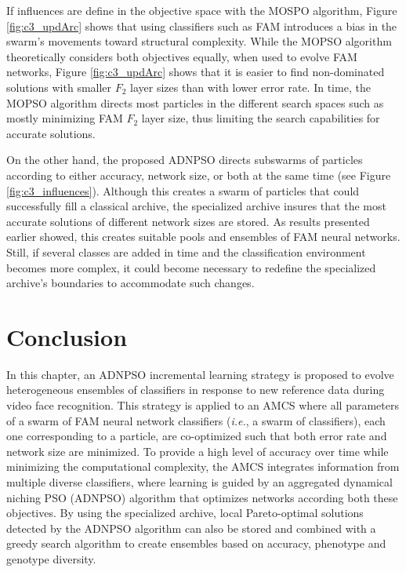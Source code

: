 If influences are define in the objective space with the MOSPO algorithm, Figure \ref{fig:c3_updArc} shows that using classifiers such as FAM introduces a bias in the swarm's movements toward structural complexity.
While the MOPSO algorithm theoretically considers both objectives equally, when used to evolve FAM networks, Figure \ref{fig:c3_updArc} shows that it is easier to find non-dominated solutions with smaller $F_2$ layer sizes than with lower error rate.
In time, the MOPSO algorithm directs most particles in the different search spaces such as mostly minimizing FAM $F_2$ layer size, thus limiting the search capabilities for accurate solutions.

On the other hand, the proposed ADNPSO directs subswarms of particles according to either accuracy, network size, or both at the same time (see Figure \ref{fig:c3_influences}).
Although this creates a swarm of particles that could successfully fill a classical archive, the specialized archive insures that the most accurate solutions of different network sizes are stored.
As results presented earlier showed, this creates suitable pools and ensembles of FAM neural networks.
Still, if several classes are added in time and the classification environment becomes more complex, it could become necessary to redefine the specialized archive's boundaries to accommodate such changes.

\section{Conclusion}
\label{sec:c3_conclusion}

In this chapter, an ADNPSO incremental learning strategy is proposed to evolve heterogeneous ensembles of classifiers in response to new reference data during video face recognition.
This strategy is applied to an AMCS where all parameters of a swarm of FAM neural network classifiers  (\emph{i.e.}, a swarm of classifiers), each one corresponding to a particle, are co-optimized such that both error rate and network size are minimized.
To provide a high level of accuracy over time while minimizing the computational complexity, the AMCS integrates information from multiple diverse classifiers, where learning is guided by an aggregated dynamical niching PSO (ADNPSO) algorithm that optimizes networks according both these objectives.
By using the specialized archive, local Pareto-optimal solutions detected by the ADNPSO algorithm can also be stored and combined with a greedy search algorithm to create ensembles based on accuracy, phenotype and genotype diversity.


